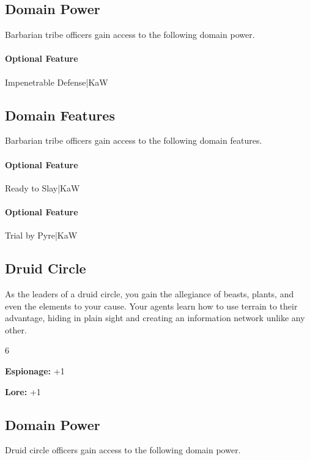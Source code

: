 \documentclass[10pt,a4paper,twoside,bg=print,twocolumn,openany,nodeprecatedcode]{dndbook}
\begin{document}
\subsection{Domain Power}
Barbarian tribe officers gain access to the following domain power.

\paragraph{Optional Feature}
Impenetrable Defense|KaW

\subsection{Domain Features}
Barbarian tribe officers gain access to the following domain features.

\paragraph{Optional Feature}
Ready to Slay|KaW

\paragraph{Optional Feature}
Trial by Pyre|KaW

\subsection{Druid Circle}
As the leaders of a druid circle, you gain the allegiance of beasts, plants, and even the elements to your cause. Your agents learn how to use terrain to their advantage, hiding in plain sight and creating an information network unlike any other.

{\par \vspace { 9pt plus 3pt minus 3pt } \noindent  {} \nopagebreak }

\begin{itemize}
\begin{multicols}{6}
\item \textbf{Espionage:} +1
\item \textbf{Lore:} +1
\end{multicols}

\end{itemize}

\subsection{Domain Power}
Druid circle officers gain access to the following domain power.
\end{document}
